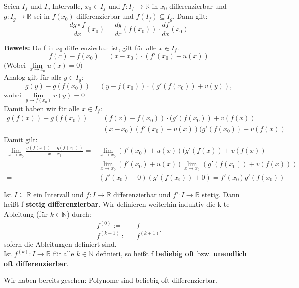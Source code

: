 \begin{Satz}[Kettenregel]{
	Seien $I_f$ und $I_g$ Intervalle, $x_0 \in I_f$ und 
	$f : I_f \rightarrow \mathbb{R}$ in $x_0$ differenzierbar und 
	$g: I_g \rightarrow \mathbb{R}$ sei in $f(x_0)$ differenzierbar und 
	$f(I_f) \subseteq I_g$. Dann gilt:
	\begin{equation*}
	\frac{d g \circ f}{dx}(x_0) = \frac{dg}{dx}(f(x_0)) \cdot \frac{df}{dx}(x_0)
	\end{equation*}
	
	\textbf{Beweis:}
	Da f in $x_0$ differenzierbar ist, gilt für alle 
	$x \in I_f$:
	\begin{equation*}
		f(x) -f(x_0) = (x-x_0) \cdot(f'(x_0) + u(x))
	\end{equation*}
	$($Wobei $\lim\limits_{x \rightarrow x_0}{u(x) = 0})$ \\
	Analog gilt für alle $y \in I_g$:
	\begin{equation*}
		g(y) -g(f(x_0)) = (y-f(x_0)) \cdot (g'(f(x_0)) + v(y)),
	\end{equation*}		
	\noindent\hspace*{5mm}wobei $\lim\limits_{y \rightarrow f(x_0)}{v(y) = 0}$ \\
	\noindent\hspace*{5mm}Damit haben wir für alle $x \in I_f$:
	\begin{align*}
	g(f(x)) - g(f(x_0)) = & (f(x)-f(x_0)) \cdot (g'(f(x_0)) + v(f(x)) \\
	= & (x-x_0)(f'(x_0) + u(x)) (g'(f(x_0)) + v(f(x))
	\end{align*}
	\noindent\hspace*{5mm}Damit gilt:
	\begin{align*}
	\lim\limits_{x \rightarrow x_0}
	{\frac{g(f(x))-g(f(x_0))}{x-x_0} } 
	= & \lim\limits_{x \rightarrow x_0}{(f'(x_0) + u(x)) (g'(f(x)) + v(f(x))} \\
	= & \lim\limits_{x \rightarrow x_0}{(f'(x_0) + u(x))} 
	\lim\limits_{x \rightarrow x_0}{(g'(f(x_0)) + v(f(x)))} \\
	= & (f'(x_0) + 0) (g'(f(x_0)) + 0)
	= f'(x_0) g'(f(x_0))
	\end{align*}
}\end{Satz}

\begin{Definition}{
	Ist $I \subseteq \mathbb{R}$ ein Intervall und 
	$f: I \rightarrow \mathbb{R}$ differenzierbar und $f':I \rightarrow \mathbb{R}$
	stetig. Dann heißt f \textbf{stetig differenzierbar}. 
	Wir definieren weiterhin induktiv die 
	k-te Ableitung (für $k \in \mathbb{N}$) durch:
	\begin{align*}
		f^{(0)} := & f \\
		f^{(k+1)} := & f^{(k+1)'}
	\end{align*}
	sofern die Ableitungen definiert sind.\\
	Ist $f^{(k)}: I \rightarrow \mathbb{R}$ für alle $k \in \mathbb{N}$ definiert, 
	so heißt f \textbf{beliebig oft} bzw. \textbf{unendlich oft differenzierbar}.
}\end{Definition}

\begin{Bemerkung}{Wir haben bereits gesehen: Polynome sind beliebig oft
	 differenzierbar.
}\end{Bemerkung}